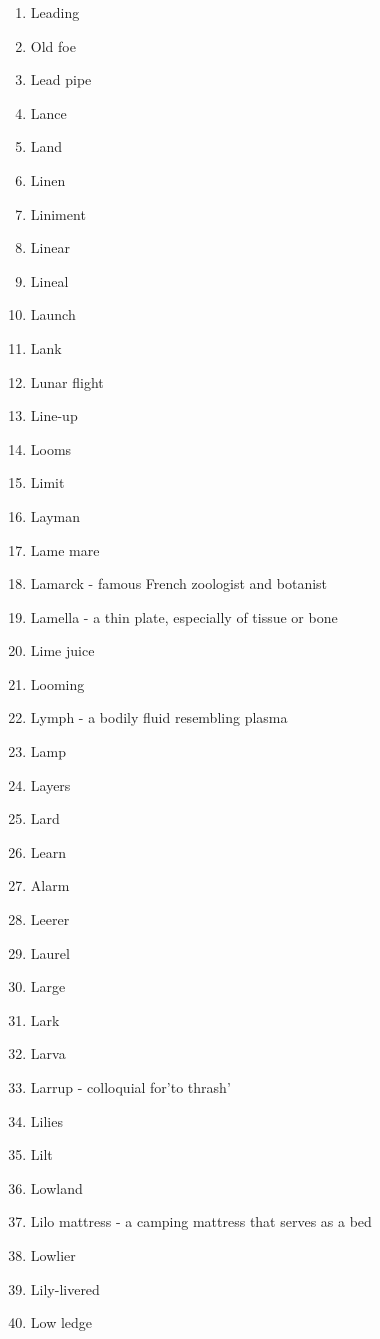 \begin{enumerate}
        \item Leading
        \item Old foe
        \item Lead pipe
        \item Lance
        \item Land
        \item Linen
        \item Liniment
        \item Linear
        \item Lineal
        \item Launch
        \item Lank
        \item Lunar flight
        \item Line-up
        \item Looms
        \item Limit
        \item Layman
        \item Lame mare
        \item Lamarck - famous French zoologist and botanist
        \item Lamella - a thin plate, especially of tissue or bone
        \item Lime juice
        \item Looming
        \item Lymph - a bodily fluid resembling plasma
        \item Lamp
        \item Layers
        \item Lard
        \item Learn
        \item Alarm
        \item Leerer
        \item Laurel
        \item Large
        \item Lark
        \item Larva
        \item Larrup - colloquial for'to thrash'
        \item Lilies
        \item Lilt
        \item Lowland
        \item Lilo mattress - a camping mattress that serves as a bed
        \item Lowlier
        \item Lily-livered
        \item Low ledge

\end{enumerate}
